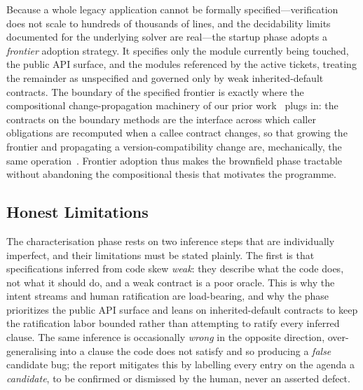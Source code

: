 Because a whole legacy application cannot be formally specified---verification does not scale to hundreds of thousands of lines, and the decidability limits documented for the underlying solver are real---the startup phase adopts a \emph{frontier} adoption strategy. It specifies only the module currently being touched, the public API surface, and the modules referenced by the active tickets, treating the remainder as unspecified and governed only by weak inherited-default contracts. The boundary of the specified frontier is exactly where the compositional change-propagation machinery of our prior work~\cite{edmonds_article3} plugs in: the contracts on the boundary methods are the interface across which caller obligations are recomputed when a callee contract changes, so that growing the frontier and propagating a version-compatibility change are, mechanically, the same operation~\cite{edmonds_article4}. Frontier adoption thus makes the brownfield phase tractable without abandoning the compositional thesis that motivates the programme.

\subsection{Honest Limitations}
\label{subsec:bf-limits}

The characterisation phase rests on two inference steps that are individually imperfect, and their limitations must be stated plainly. The first is that specifications inferred from code skew \emph{weak}: they describe what the code does, not what it should do, and a weak contract is a poor oracle. This is why the intent streams and human ratification are load-bearing, and why the phase prioritizes the public API surface and leans on inherited-default contracts to keep the ratification labor bounded rather than attempting to ratify every inferred clause. The same inference is occasionally \emph{wrong} in the opposite direction, over-generalising into a clause the code does not satisfy and so producing a \emph{false} candidate bug; the report mitigates this by labelling every entry on the agenda a \emph{candidate}, to be confirmed or dismissed by the human, never an asserted defect.

